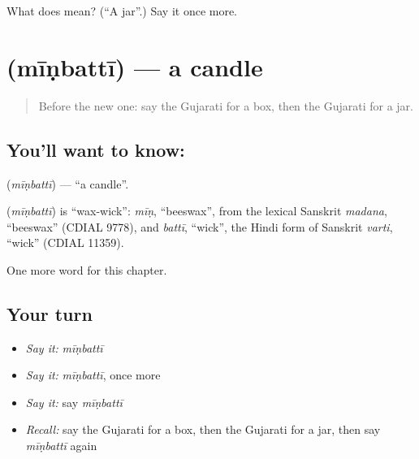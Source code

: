 \begin{tcolorbox}[breakable,colback=teal!4,colframe=teal!35!black,title={Before you move on}]
What does  mean? (\textquotedblleft{}A jar\textquotedblright{}.) Say it once more.
\end{tcolorbox}
\section[\texorpdfstring{\gu{મીણબત્તી} (mīṇbattī)}{મીણબત્તી (mīṇbattī)}]{ (mīṇbattī) — a candle}

\label{lesson:GU-C110-minbatti}



\begin{quote}
Before the new one: say the Gujarati for a box, then the Gujarati for a jar.
\end{quote}

\subsection*{You'll want to know: }
\textbf{} (\emph{mīṇbattī}) — \textquotedblleft{}a candle\textquotedblright{}.

\begin{cousinweb}
\textbf{} (\emph{mīṇbattī}) is \textquotedblleft{}wax-wick\textquotedblright{}: \emph{mīṇ}, \textquotedblleft{}beeswax\textquotedblright{}, from the lexical Sanskrit \emph{madana}, \textquotedblleft{}beeswax\textquotedblright{} (CDIAL 9778), and \emph{battī}, \textquotedblleft{}wick\textquotedblright{}, the Hindi form of Sanskrit \emph{varti}, \textquotedblleft{}wick\textquotedblright{} (CDIAL 11359).
\end{cousinweb}

\begin{grammarlens}[title={What you've built}]
One more word for this chapter.
\end{grammarlens}

\subsection*{Your turn}
\begin{itemize}
\raggedright
  \item \emph{Say it:} \emph{mīṇbattī}
  \item \emph{Say it:} \emph{mīṇbattī}, once more
  \item \emph{Say it:} say \emph{mīṇbattī}
  \item \emph{Recall:} say the Gujarati for a box, then the Gujarati for a jar, then say \emph{mīṇbattī} again
\end{itemize}

